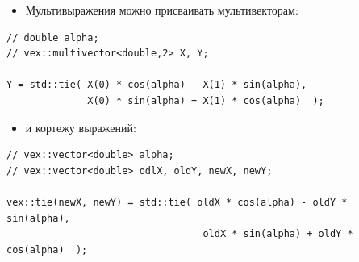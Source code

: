 \documentclass[@BEAMER_OPTIONS@]{beamer}
\begin{document}
\begin{frame}[fragile]{}
    \begin{itemize}
        \item Мультивыражения можно присваивать мультивекторам:
    \end{itemize}
    \begin{exampleblock}{}
        \begin{lstlisting}
// double alpha;
// vex::multivector<double,2> X, Y;

Y = std::tie( X(0) * cos(alpha) - X(1) * sin(alpha),
              X(0) * sin(alpha) + X(1) * cos(alpha)  );
        \end{lstlisting}
    \end{exampleblock}
    \begin{itemize}
        \item и кортежу выражений:
    \end{itemize}
    \begin{exampleblock}{}
        \begin{lstlisting}
// vex::vector<double> alpha;
// vex::vector<double> odlX, oldY, newX, newY;

vex::tie(newX, newY) = std::tie( oldX * cos(alpha) - oldY * sin(alpha),
                                  oldX * sin(alpha) + oldY * cos(alpha)  );
        \end{lstlisting}
    \end{exampleblock}
\end{frame}

\end{document}
